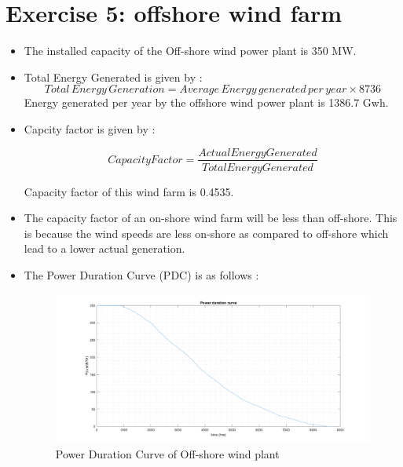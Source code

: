 \section*{\textbf{Exercise 5: offshore wind farm}}
\begin{itemize}
    \item  The installed capacity of the Off-shore wind power plant is 350 MW.
    \item  Total Energy Generated is given by :
     \begin{equation}
         Total \,Energy\, Generation = Average \,Energy\, generated\, per\, year \times 8736
     \end{equation}
     Energy generated per year by the offshore wind power plant is 1386.7 Gwh.
    \item Capcity factor is given by :
    
    \[Capacity Factor =\frac{Actual Energy Generated}{Total Energy Generated}\]
    
     
    Capacity factor of this wind farm is 0.4535.
    \item The capacity factor of an on-shore wind farm will be less than off-shore. This is because the wind speeds are less on-shore as compared to off-shore which lead to a lower actual generation.
    \item The Power Duration Curve (PDC) is as follows :
    \begin{figure}[H]
        \centering
        \includegraphics[width=0.8 \linewidth]{PDC_Q6.png}
        \caption{Power Duration Curve of Off-shore wind plant}
        \label{fig:my_label}
    \end{figure}
\end{itemize}
